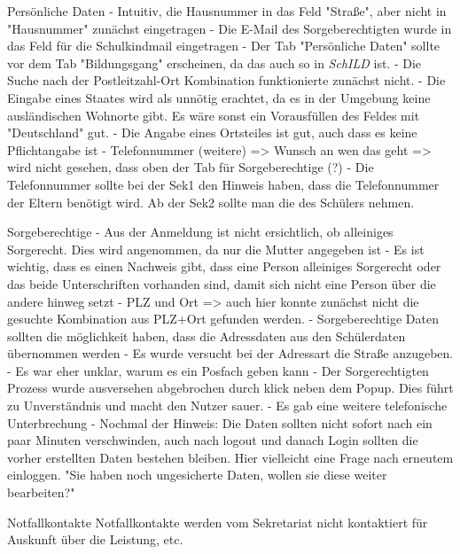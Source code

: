 Persönliche Daten
- Intuitiv, die Hausnummer in das Feld "Straße", aber nicht in "Hausnummer" zunächst eingetragen
- Die E-Mail des Sorgeberechtigten wurde in das Feld für die Schulkindmail eingetragen
- Der Tab "Persönliche Daten" sollte vor dem Tab "Bildungsgang" erscheinen, da das auch so in \textit{SchILD} ist.
- Die Suche nach der Postleitzahl-Ort Kombination funktionierte zunächst nicht.
- Die Eingabe eines Staates wird als unnötig erachtet, da es in der Umgebung keine ausländischen Wohnorte gibt. Es wäre sonst ein Vorausfüllen des Feldes mit "Deutschland" gut.
- Die Angabe eines Ortsteiles ist gut, auch dass es keine Pflichtangabe ist
- Telefonnummer (weitere) => Wunsch an wen das geht => wird nicht gesehen, dass oben der Tab für Sorgeberechtige (?) 
- Die Telefonnummer sollte bei der Sek1 den Hinweis haben, dass die Telefonnummer der Eltern benötigt wird. Ab der Sek2 sollte man die des Schülers nehmen.               




Sorgeberechtige
- Aus der Anmeldung ist nicht ersichtlich, ob alleiniges Sorgerecht. Dies wird angenommen, da nur die Mutter angegeben ist
- Es ist wichtig, dass es einen Nachweis gibt, dass eine Person alleiniges Sorgerecht oder das beide Unterschriften vorhanden sind, damit sich nicht eine Person über die andere hinweg setzt
- PLZ und Ort => auch hier konnte zunächst nicht die gesuchte Kombination aus PLZ+Ort gefunden werden.
- Sorgeberechtige Daten sollten die möglichkeit haben, dass die Adressdaten aus den Schülerdaten übernommen werden
- Es wurde versucht bei der Adressart die Straße anzugeben. 
- Es war eher unklar, warum es ein Posfach geben kann
- Der Sorgerechtigten Prozess wurde ausversehen abgebrochen durch klick neben dem Popup. Dies führt zu Unverständnis und macht den Nutzer sauer.
- Es gab eine weitere telefonische Unterbrechung
- Nochmal der Hinweis: Die Daten sollten nicht sofort nach ein paar Minuten verschwinden, auch nach logout und danach Login sollten die vorher erstellten Daten bestehen bleiben. Hier vielleicht eine Frage nach erneutem einloggen. "Sie haben noch ungesicherte Daten, wollen sie diese weiter bearbeiten?"















Notfallkontakte
Notfallkontakte werden vom Sekretariat nicht kontaktiert für Auskunft über die Leistung, etc.	


















